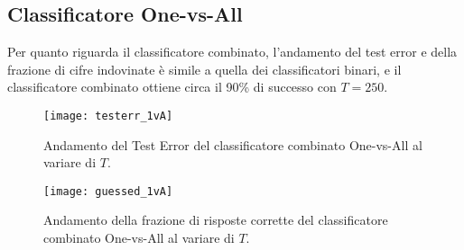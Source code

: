 \subsection{Classificatore One-vs-All}

Per quanto riguarda il classificatore combinato, l'andamento del test error e della frazione di cifre indovinate \`e simile a quella dei classificatori binari, e il classificatore combinato ottiene circa il 90\% di successo con \(T = 250\). 

\newpage
\thispagestyle{empty}

\begin{figure}[H]
\centering
\texttt{[image: testerr\_1vA]}
\caption{Andamento del Test Error del classificatore combinato One-vs-All al variare di $T$.}

\texttt{[image: guessed\_1vA]}
\caption{Andamento della frazione di risposte corrette del classificatore combinato One-vs-All al variare di $T$.}
\label{fig:1vA}
\end{figure}

\pagebreak